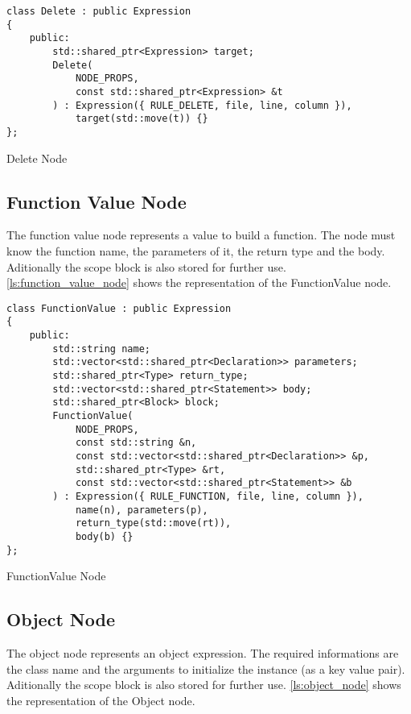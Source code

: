 \begin{listing}[H]
\begin{verbatim}
class Delete : public Expression
{
    public:
        std::shared_ptr<Expression> target;
        Delete(
            NODE_PROPS,
            const std::shared_ptr<Expression> &t
        ) : Expression({ RULE_DELETE, file, line, column }),
            target(std::move(t)) {}
};
\end{verbatim}
\caption{Delete Node}
\label{ls:delete_node}
\end{listing}

\subsection{Function Value Node}

The function value node represents a value to build a function. The node must know the function name,
the parameters of it, the return type and the body. Aditionally the scope block is also stored for further use.
\autoref{ls:function_value_node} shows the representation of the FunctionValue node.

\begin{listing}[H]
\begin{verbatim}
class FunctionValue : public Expression
{
    public:
        std::string name;
        std::vector<std::shared_ptr<Declaration>> parameters;
        std::shared_ptr<Type> return_type;
        std::vector<std::shared_ptr<Statement>> body;
        std::shared_ptr<Block> block;
        FunctionValue(
            NODE_PROPS,
            const std::string &n,
            const std::vector<std::shared_ptr<Declaration>> &p,
            std::shared_ptr<Type> &rt,
            const std::vector<std::shared_ptr<Statement>> &b
        ) : Expression({ RULE_FUNCTION, file, line, column }),
            name(n), parameters(p),
            return_type(std::move(rt)),
            body(b) {}
};
\end{verbatim}
\caption{FunctionValue Node}
\label{ls:function_value_node}
\end{listing}

\subsection{Object Node}

The object node represents an object expression. The required informations are the class name and the arguments to initialize the instance (as a key value pair).
Aditionally the scope block is also stored for further use.
\autoref{ls:object_node} shows the representation of the Object node.

